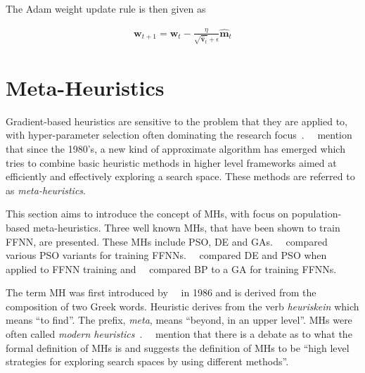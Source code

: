The \acs{Adam} weight update rule is then given as

\begin{equation}
	\label{eq:heuristics:gd:adam}
	\begin{split}
		\boldsymbol{w}_{t+1} = \boldsymbol{w}_{t} - \frac{\eta}{\sqrt{\hat{\boldsymbol{v}}_{t}} + \epsilon}\hat{\boldsymbol{m}}_{t}
	\end{split}
\end{equation}

\section{Meta-Heuristics}\label{sec:heuristics:mh}

Gradient-based heuristics are sensitive to the problem that they are applied to, with hyper-parameter selection often dominating the research focus~\cite{ref:bengio:2000, ref:feurer:2019}.~\citeauthor{ref:blum:2003}~\cite{ref:blum:2003} mention that since the 1980's, a new kind of approximate algorithm has emerged which tries to combine basic heuristic methods in higher level frameworks aimed at efficiently and effectively exploring a search space. These methods are referred to as \textit{meta-heuristics}.

This section aims to introduce the concept of \acp{MH}, with focus on population-based meta-heuristics. Three well known \acp{MH}, that have been shown to train \acs{FFNN}, are presented. These \acp{MH} include \acf{PSO}, \acf{DE} and \acfp{GA}.~\citeauthor{ref:carvalho:2006}~\cite{ref:carvalho:2006} compared various \acs{PSO} variants for training \acp{FFNN}.~\citeauthor{ref:espinal:2011}~\cite{ref:espinal:2011} compared \acs{DE} and \acs{PSO} when applied to \acs{FFNN} training and~\citeauthor{ref:gupta:1999}~\cite{ref:gupta:1999} compared \acs{BP} to a \acs{GA} for training \acp{FFNN}.

The term \acf{MH} was first introduced by~\citeauthor{ref:glover:1986}~\cite{ref:glover:1986} in 1986 and is derived from the composition of two Greek words. Heuristic derives from the verb \textit{heuriskein} which means ``to find''. The prefix, \textit{meta}, means ``beyond, in an upper level''. \Acp{MH} were often called \textit{modern heuristics}~\cite{ref:reeves:1993}.~\citeauthor{ref:blum:2003}~\cite{ref:blum:2003} mention that there is a debate as to what the formal definition of \acp{MH} is and suggests the definition of \acp{MH} to be ``high level strategies for exploring search spaces by using different methods''.

